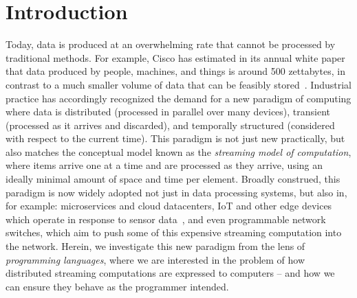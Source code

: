 \section{Introduction}
\label{sec:intro}

Today, data is produced at an overwhelming rate
that cannot be processed by traditional methods.
For example, Cisco has estimated in its annual white paper
that data produced by people, machines, and things
is around 500 zettabytes, in contrast to a much smaller volume
of data that can be feasibly stored~\cite{index2018forecast}.
Industrial practice has accordingly recognized the demand
for a new paradigm of computing
where data is
distributed (processed in parallel over many devices),
transient (processed as it arrives and discarded),
and temporally structured (considered with respect to the current time).
This paradigm is not just new practically, but also matches the conceptual
model known as the \emph{streaming model of computation},
where items arrive one at a time and are processed as they arrive, using
an ideally minimal amount of space and time per element.
Broadly construed, this paradigm is now widely adopted not just in
data processing systems, but also in, for example: microservices and
cloud datacenters, IoT and other edge devices which operate in response
to sensor data~\cite{shi2016edge, ashton2009internet}, and even programmable network switches,
which aim to push some of this expensive streaming computation
into the network.
Herein, we investigate this new paradigm from the lens of \emph{programming languages}, where we are interested in the problem of how distributed streaming computations are expressed to computers -- and how we can ensure they behave as the programmer intended.


